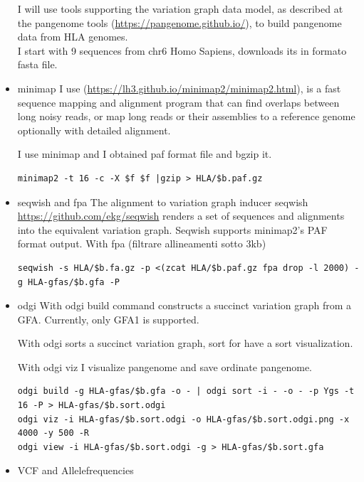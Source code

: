 \begin{itemize}
   

I will use tools supporting the variation graph data model, as described at the pangenome tools (\url{https://pangenome.github.io/}), to build pangenome data from HLA genomes.\\

I start with 9 sequences from chr6 Homo Sapiens, downloads its in formato fasta file. 


\item minimap 
I use (\url{https://lh3.github.io/minimap2/minimap2.html}), is a fast sequence mapping and alignment program that can find overlaps between long noisy reads, or map long reads or their assemblies to a reference genome optionally with detailed alignment. 

I use minimap and I obtained paf format file and bgzip it.

\begin{verbatim}
minimap2 -t 16 -c -X $f $f |gzip > HLA/$b.paf.gz 
\end{verbatim}


\item seqwish and fpa
The alignment to variation graph inducer seqwish \url{https://github.com/ekg/seqwish} renders a set of sequences and alignments into the equivalent variation graph.
Seqwish supports minimap2's PAF format output.
With fpa (filtrare allineamenti sotto 3kb)
    
\begin{verbatim}
seqwish -s HLA/$b.fa.gz -p <(zcat HLA/$b.paf.gz fpa drop -l 2000) -g HLA-gfas/$b.gfa -P
\end{verbatim}
  
\item odgi
With odgi build command constructs a succinct variation graph from a GFA. Currently, only GFA1 is supported.


With odgi sorts a succinct variation graph, sort for have a sort visualization.


With odgi viz I visualize pangenome and save ordinate pangenome. 

\begin{verbatim}
odgi build -g HLA-gfas/$b.gfa -o - | odgi sort -i - -o - -p Ygs -t 16 -P > HLA-gfas/$b.sort.odgi 
odgi viz -i HLA-gfas/$b.sort.odgi -o HLA-gfas/$b.sort.odgi.png -x 4000 -y 500 -R
odgi view -i HLA-gfas/$b.sort.odgi -g > HLA-gfas/$b.sort.gfa
\end{verbatim}

\item VCF and Allelefrequencies


\end{itemize}
